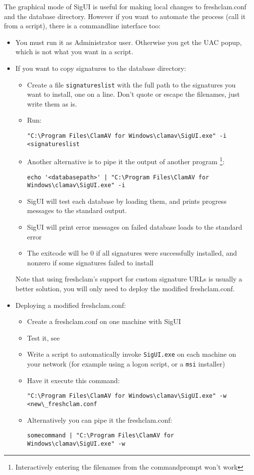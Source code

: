 The graphical mode of SigUI is useful for making local changes to \gls{freshclam.conf} and the database directory. However if you want to automate the process (call it from a script), there is a commandline interface too:
\begin{itemize}
	\item You must run it as Administrator user. Otherwise you get the \gls{UAC} popup, which is not what you want in a script.
	\item If you want to copy signatures to the database directory:
		\begin{itemize}
			\item Create a file \verb+signatureslist+ with the full path to the signatures you want to install, one on a line. Don't quote or escape the filenames, just write them as is.
			\item Run:
\begin{verbatim}
"C:\Program Files\ClamAV for Windows\clamav\SigUI.exe" -i <signatureslist
\end{verbatim}
			\item Another alternative is to pipe it the output of another program \footnote{Interactively entering the filenames from the commandprompt won't work}:
\begin{verbatim}
echo '<databasepath>' | "C:\Program Files\ClamAV for Windows\clamav\SigUI.exe" -i
\end{verbatim}
			\item SigUI will test each database by loading them, and prints progress messages to the standard output.
			\item SigUI will print error messages on failed database loads to the standard error
			\item The exitcode will be 0 if all signatures were successfully installed, and nonzero if some signatures failed to install
		\end{itemize}
Note that using \gls{freshclam}'s support for custom signature URLs is usually a better solution, you will only need to deploy the modified \gls{freshclam.conf}.
\item Deploying a modified \gls{freshclam.conf}:

\begin{itemize}
\item Create a \gls{freshclam.conf} on one machine with \gls{SigUI}
\item Test it, see 
\item Write a script to automatically invoke \verb+SigUI.exe+ on each machine on your network (for example using a logon script, or a \verb+msi+ installer)
\item Have it execute this command:
\begin{verbatim}
"C:\Program Files\ClamAV for Windows\clamav\SigUI.exe" -w <new\_freshclam.conf
\end{verbatim}
\item Alternatively you can pipe it the freshclam.conf:
\begin{verbatim}
somecommand | "C:\Program Files\ClamAV for Windows\clamav\SigUI.exe" -w
\end{verbatim}


\end{itemize}
\end{itemize}
